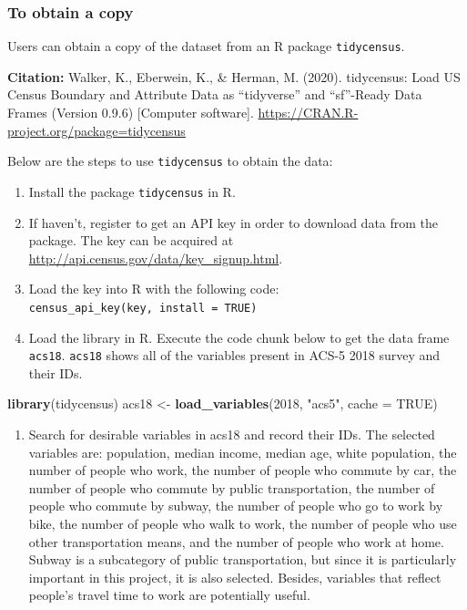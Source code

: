 \documentclass[
]{article}
\newenvironment{Shaded}{\begin{snugshade}}{\end{snugshade}}
\newcommand{\DataTypeTok}[1]{\textcolor[rgb]{0.13,0.29,0.53}{#1}}
\newcommand{\DecValTok}[1]{\textcolor[rgb]{0.00,0.00,0.81}{#1}}
\newcommand{\KeywordTok}[1]{\textcolor[rgb]{0.13,0.29,0.53}{\textbf{#1}}}
\newcommand{\NormalTok}[1]{#1}
\newcommand{\OtherTok}[1]{\textcolor[rgb]{0.56,0.35,0.01}{#1}}
\newcommand{\StringTok}[1]{\textcolor[rgb]{0.31,0.60,0.02}{#1}}
\providecommand{\tightlist}{%
  \setlength{\itemsep}{0pt}\setlength{\parskip}{0pt}}
\begin{document}
\hypertarget{to-obtain-a-copy-1}{%
\subsubsection{To obtain a copy}\label{to-obtain-a-copy-1}}

Users can obtain a copy of the dataset from an R package
\texttt{tidycensus}.

\textbf{Citation:} Walker, K., Eberwein, K., \& Herman, M. (2020).
tidycensus: Load US Census Boundary and Attribute Data as ``tidyverse''
and ``sf''-Ready Data Frames (Version 0.9.6) {[}Computer software{]}.
\url{https://CRAN.R-project.org/package=tidycensus}

Below are the steps to use \texttt{tidycensus} to obtain the data:

\begin{enumerate}
\def\labelenumi{\arabic{enumi}.}
\tightlist
\item
  Install the package \texttt{tidycensus} in R.
\item
  If haven't, register to get an API key in order to download data from
  the package. The key can be acquired at
  \url{http://api.census.gov/data/key_signup.html}.
\item
  Load the key into R with the following code:\\
  \texttt{census\_api\_key(key,\ install\ =\ TRUE)}~\\
\item
  Load the library in R. Execute the code chunk below to get the data
  frame \texttt{acs18}. \texttt{acs18} shows all of the variables
  present in ACS-5 2018 survey and their IDs.
\end{enumerate}

\begin{Shaded}
\begin{Highlighting}[]
\KeywordTok{library}\NormalTok{(tidycensus)}
\NormalTok{acs18 <-}\StringTok{ }\KeywordTok{load_variables}\NormalTok{(}\DecValTok{2018}\NormalTok{, }\StringTok{"acs5"}\NormalTok{, }\DataTypeTok{cache =} \OtherTok{TRUE}\NormalTok{)}
\end{Highlighting}
\end{Shaded}

\begin{enumerate}
\def\labelenumi{\arabic{enumi}.}
\setcounter{enumi}{4}
\tightlist
\item
  Search for desirable variables in acs18 and record their IDs. The
  selected variables are: population, median income, median age, white
  population, the number of people who work, the number of people who
  commute by car, the number of people who commute by public
  transportation, the number of people who commute by subway, the number
  of people who go to work by bike, the number of people who walk to
  work, the number of people who use other transportation means, and the
  number of people who work at home. Subway is a subcategory of public
  transportation, but since it is particularly important in this
  project, it is also selected. Besides, variables that reflect people's
  travel time to work are potentially useful.
\end{enumerate}
\end{document}
